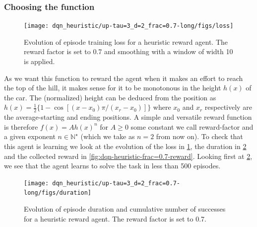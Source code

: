 \documentclass[a4paper, 12pt,oneside]{article}
\begin{document}
        \subsubsection{Choosing the function}
        \begin{figure}
            \centering
            \vspace{-6em}
            \texttt{[image: dqn\_heuristic/up-tau=3\_d=2\_frac=0.7-long/figs/loss]}
            \caption{Evolution of episode training loss for a heuristic reward agent. The reward factor is set to 0.7 and smoothing with a window of width 10 is applied.}
            \label{fig:dqn-heuristic-frac=0.7-loss}
        \end{figure}
        As we want this function to reward the agent when it makes an effort to reach the top of the hill, it makes sense for it to be monotonous in the height $h(x)$ of the car. The (normalized) height can be deduced from the position as $h(x) = \frac{1}{2}\{1-\cos[(x-x_0)\pi/(x_r-x_0)]\}$ where $x_0$ and $x_r$ respectively are the average-starting and ending positions. 
        A simple and versatile reward function is therefore $f(x) = Ah(x)^n$
        for $A\ge 0$ some constant we call reward-factor and a given exponent $n\in\mathbb N^\star$ (which we take as $n=2$ from now on). 
        To check that this agent is learning we look at the evolution of the loss in \ref{fig:dqn-heuristic-frac=0.7-loss}, the duration in \ref{fig:dqn-heuristic-frac=0.7-duration} and the collected reward in \ref{fig:dqn-heuristic-frac=0.7-reward}. Looking first at \ref{fig:dqn-heuristic-frac=0.7-duration}, we see that the agent learns to  solve the task in less than 500 episodes. 
        \begin{figure}[h!]
            \centering
            \vspace{0em}
            \texttt{[image: dqn\_heuristic/up-tau=3\_d=2\_frac=0.7-long/figs/duration]}
            \caption{Evolution of episode duration and cumulative number of successes for a heuristic reward agent. The reward factor is set to 0.7.}
            \label{fig:dqn-heuristic-frac=0.7-duration}
        \end{figure}
\end{document}
